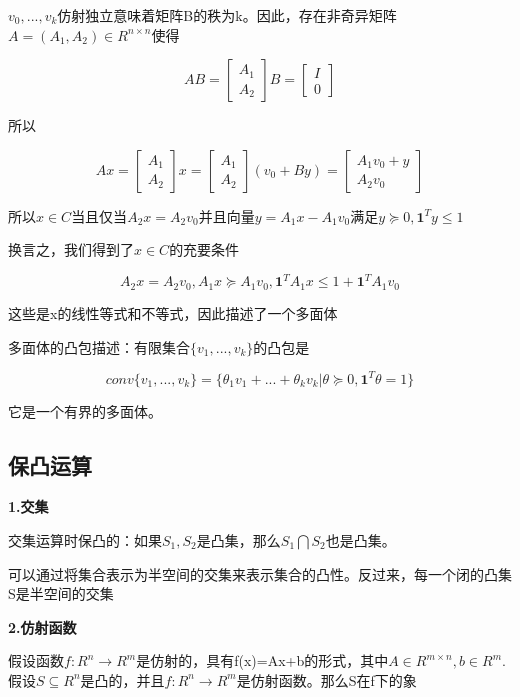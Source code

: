 \documentclass{ctexart}
\begin{document}
	\(v_0,...,v_k\)仿射独立意味着矩阵B的秩为k。因此，存在非奇异矩阵\(A=(A_1, A_2) \in R^{n \times n}\)使得
	
	\[AB = \begin{bmatrix}
		A_1 \\
		A_2
	\end{bmatrix}B = \begin{bmatrix}
	I \\
	0
	\end{bmatrix}\]
	
	所以
	
	\[Ax = \begin{bmatrix}
	A_1 \\
	A_2
	\end{bmatrix}x = \begin{bmatrix}
	A_1 \\
	A_2
	\end{bmatrix}(v_0+By) = \begin{bmatrix}
	A_1v_0+y \\
	A_2v_0
	\end{bmatrix}\]
	
	所以\(x\in C\)当且仅当\(A_2x = A_2v_0\)并且向量\(y=A_1x-A_1v_0\)满足\(y \succeq 0, \bm{1}^Ty \leq 1\)
	
	换言之，我们得到了\(x\in C\)的充要条件
	
	\[A_2x = A_2v_0,  A_1x \succeq A_1v_0,  \bm{1}^TA_1x \leq 1+\bm{1}^TA_1v_0\]
	
	这些是x的线性等式和不等式，因此描述了一个多面体
	
	多面体的凸包描述：有限集合\(\{v_1,...,v_k\}\)的凸包是
	
	\[conv\{v_1,...,v_k\}=\{\theta_1v_1+...+\theta_kv_k|\theta \succeq 0, \bm{1}^T\theta =1\}\]
	
	它是一个有界的多面体。
	
	\subsection{保凸运算}
	
	\textbf{1.交集}
	
	交集运算时保凸的：如果\(S_1,S_2\)是凸集，那么\(S_1 \bigcap S_2\)也是凸集。
	
	可以通过将集合表示为半空间的交集来表示集合的凸性。反过来，每一个闭的凸集S是半空间的交集
	
	\textbf{2.仿射函数}
	
	假设函数\(f:R^n \to R^m\)是仿射的，具有f(x)=Ax+b的形式，其中\(A\in R^{m\times n}, b \in R^m\).假设\(S \subseteq R^n\)是凸的，并且\(f:R^n \to R^m\)是仿射函数。那么S在f下的象
	
\end{document}
